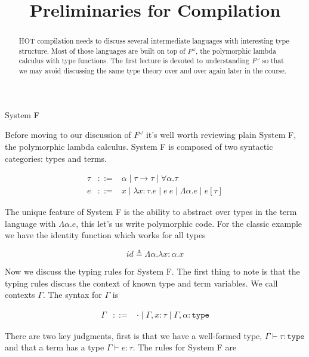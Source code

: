 \documentclass{amsart}
\title{Preliminaries for Compilation}
\newcommand{\type}{\ensuremath{\mathtt{type}}}
\begin{document}
\maketitle

\begin{abstract}
  HOT compilation needs to discuss several intermediate languages with
  interesting type structure. Most of those languages are built on top
  of $F^\omega$, the polymorphic lambda calculus with type
  functions. The first lecture is devoted to understanding $F^\omega$
  so that we may avoid discussing the same type theory over and over
  again later in the course.
\end{abstract}

\begin{section}{System F}

Before moving to our discussion of $F^\omega$ it's well worth
reviewing plain System F, the polymorphic lambda calculus. System F is
composed of two syntactic categories: types and terms.

\[
\begin{array}{lcl}
  \tau & ::= & \alpha \mid \tau \to \tau \mid \forall \alpha. \tau\\
  e & ::= & x \mid \lambda x : \tau. e \mid e\ e \mid
            \Lambda \alpha. e \mid e[\tau]
\end{array}
\]

The unique feature of System F is the ability to abstract over types
in the term language with $\Lambda \alpha. e$, this let's us write
polymorphic code. For the classic example we have the identity
function which works for all types

\[
  id \triangleq \Lambda \alpha. \lambda x : \alpha. x
\]

Now we discuss the typing rules for System F. The first thing to note
is that the typing rules discuss the context of known type and term
variables. We call contexts $\Gamma$. The syntax for $\Gamma$ is

\[
\begin{array}{lcl}
  \Gamma & ::= & \cdot \mid \Gamma, x : \tau \mid \Gamma, \alpha : \type
\end{array}
\]

There are two key
judgments, first is that we have a well-formed type, $\Gamma \vdash
\tau : \type$ and that a term has a type $\Gamma \vdash e : \tau$. The
rules for System F are


\end{section}
\end{document}
